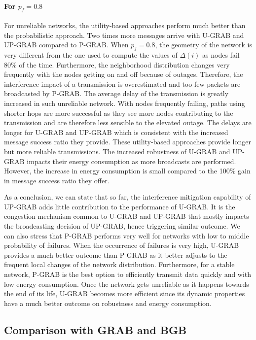 \documentclass[journal, peerreview, onecolumn, draftcls]{IEEEtran}
\begin{document}
\paragraph{\rm For $p_f=0.8$}
For unreliable networks, the utility-based approaches perform much better than the probabilistic approach. Two times more messages arrive with U-GRAB and UP-GRAB compared to P-GRAB. When $p_f=0.8$, the geometry of the network is very different from the one used to compute the values of $\Delta(i)$ as nodes fail 80\% of the time. Furthermore, the neighborhood distribution changes very frequently with the nodes getting on and off because of outages. Therefore, the interference impact of a transmission is overestimated and too few packets are broadcasted by P-GRAB.
The average delay of the transmission is greatly increased in such unreliable network. With nodes frequently failing, paths using shorter hops are more successful as they see more nodes contributing to the transmission and are therefore less sensible to the elevated outage. The delays are longer for U-GRAB and UP-GRAB which is consistent with the increased message success ratio they provide. These utility-based approaches provide longer but more reliable transmissions.
The increased robustness of U-GRAB and UP-GRAB impacts their energy consumption as more broadcasts are performed. However, the increase in energy consumption is small compared to the 100\% gain in message success ratio they offer.

As a conclusion, we can state that so far, the interference mitigation capability of UP-GRAB adds little contribution to the performance of U-GRAB. It is the congestion mechanism common to U-GRAB and UP-GRAB that mostly impacts the broadcasting decision of UP-GRAB, hence triggering similar outcome.
We can also stress that P-GRAB performs very well for networks with low to middle probability of failures. When the occurrence of failures is very high, U-GRAB provides a much better outcome than P-GRAB as it better adjusts to the frequent local changes of the network distribution. Furthermore, for a stable network, P-GRAB is the best option to efficiently transmit data quickly and with low energy consumption. Once the network gets unreliable as it happens towards the end of its life, U-GRAB becomes more efficient since its dynamic properties have a much better outcome on robustness and energy consumption.

\subsection{Comparison with GRAB and BGB}
\end{document}
